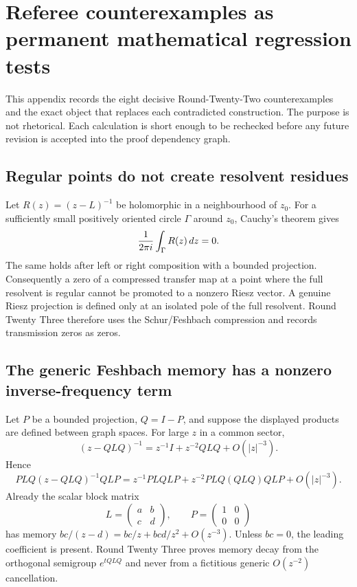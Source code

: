 \section{Referee counterexamples as permanent mathematical regression tests}
\label{sec:r23-regression-appendix}

This appendix records the eight decisive Round-Twenty-Two counterexamples and
the exact object that replaces each contradicted construction.  The purpose is
not rhetorical.  Each calculation is short enough to be rechecked before any
future revision is accepted into the proof dependency graph.

\subsection{Regular points do not create resolvent residues}

Let $R(z)=(z-L)^{-1}$ be holomorphic in a neighbourhood of $z_0$.  For a
sufficiently small positively oriented circle $\Gamma$ around $z_0$, Cauchy's
theorem gives
\[
 {1\over2\pi i}\int_\Gamma R(z)\,dz=0.
\]
The same holds after left or right composition with a bounded projection.
Consequently a zero of a compressed transfer map at a point where the full
resolvent is regular cannot be promoted to a nonzero Riesz vector.  A genuine
Riesz projection is defined only at an isolated pole of the full resolvent.
Round Twenty Three therefore uses the Schur/Feshbach compression and records
transmission zeros as zeros.

\subsection{The generic Feshbach memory has a nonzero inverse-frequency term}

Let $P$ be a bounded projection, $Q=I-P$, and suppose the displayed products
are defined between graph spaces.  For large $z$ in a common sector,
\[
 (z-QLQ)^{-1}=z^{-1}I+z^{-2}QLQ+O(|z|^{-3}).
\]
Hence
\[
 PLQ(z-QLQ)^{-1}QLP
 =z^{-1}PLQLP+z^{-2}PLQ(QLQ)QLP+O(|z|^{-3}).
\]
Already the scalar block matrix
\[
 L=\begin{pmatrix}a&b\\c&d\end{pmatrix},
 \qquad P=\begin{pmatrix}1&0\\0&0\end{pmatrix}
\]
has memory $bc/(z-d)=bc/z+bcd/z^2+O(z^{-3})$.  Unless $bc=0$, the leading
coefficient is present.  Round Twenty Three proves memory decay from the
orthogonal semigroup $e^{tQLQ}$ and never from a fictitious generic
$O(z^{-2})$ cancellation.

